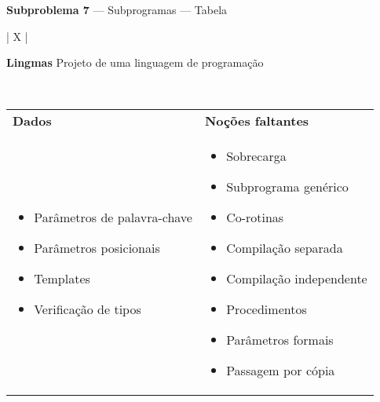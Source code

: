 \documentclass[12pt, a4paper]{article}
\begin{document}
\begin{center}
\large \textbf{Subproblema 7} --- Subprogramas --- Tabela
\end{center}

\bigskip

\begin{longtabu}{| X |}
    \hline
    \begin{center}
        \large \textbf{Lingmas} \linebreak
        Projeto de uma linguagem de programação
    \end{center}
    \\ \hline

    \begin{tabu}{ X | X }
        \textbf{Dados} &
        \textbf{Noções faltantes}
        \\
        \begin{minipage}[t]{\linewidth}
        \begin{itemize}[itemsep=.5ex,parsep=.0ex,after=\strut,leftmargin=15pt]
            \item Parâmetros de palavra-chave
            \item Parâmetros posicionais
            \item Templates
            \item Verificação de tipos
        \end{itemize}
        \end{minipage}
        &
        \begin{minipage}[t]{\linewidth}
        \begin{itemize}[itemsep=.5ex,parsep=.0ex,after=\strut,leftmargin=15pt]
            \item
            Sobrecarga
            \item
            Subprograma genérico
            \item
            Co-rotinas
            \item
            Compilação separada
            \item
            Compilação independente
            \item
            Procedimentos
            \item
            Parâmetros formais
            \item
            Passagem por cópia
        \end{itemize}
        \end{minipage}
    \end{tabu}
    \\ \hline


\end{longtabu}
\end{document}
